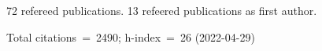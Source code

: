 72 refereed publications. 13 refeered publications as first author.

Total citations~=~2490; h-index~=~26 (2022-04-29)